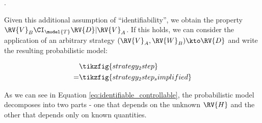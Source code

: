 .

Given this additional assumption of ``identifiability'', we obtain the property $\RV{V}_B\CI_{\model{T}} \RV{D}|\RV{V}_A$. If this holds, we can consider the application of an arbitrary strategy $(\RV{V}_A,\RV{W}_B)\kto \RV{D}$ and write the resulting probabilistic model:

\begin{align}
 &\tikzfig{strategy_2step}\\
 =&\tikzfig{strategy_2step_simplified}\label{eq:identifiable_controllable}
\end{align}

As we can see in Equation \ref{eq:identifiable_controllable}, the probabilistic model decomposes into two parts - one that depends on the unknown $\RV{H}$ and the other that depends only on known quantities.